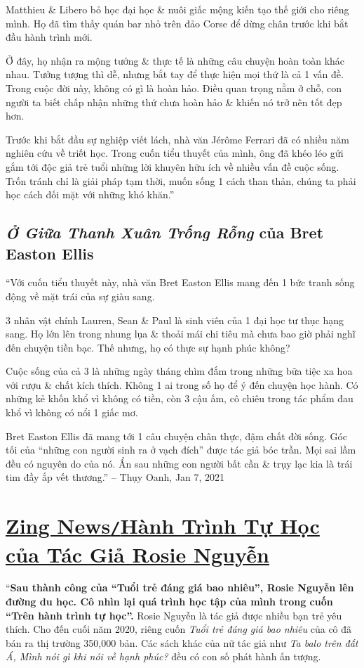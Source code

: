 \documentclass[oneside]{book}
\numberwithin{equation}{section}
\begin{document}
Matthieu \& Libero bỏ học đại học \& nuôi giấc mộng kiến tạo thế giới cho riêng mình. Họ đã tìm thấy quán bar nhỏ trên đảo Corse để dừng chân trước khi bắt đầu hành trình mới.

Ở đây, họ nhận ra mộng tưởng \& thực tế là những câu chuyện hoàn toàn khác nhau. Tưởng tượng thì dễ, nhưng bắt tay để thực hiện mọi thứ là cả 1 vấn đề. Trong cuộc đời này, không có gì là hoàn hảo. Điều quan trọng nằm ở chỗ, con người ta biết chấp nhận những thứ chưa hoàn hảo \& khiến nó trở nên tốt đẹp hơn.

Trước khi bắt đầu sự nghiệp viết lách, nhà văn J\'er\^ome Ferrari đã có nhiều năm nghiên cứu về triết học. Trong cuốn tiểu thuyết của mình, ông đã khéo léo gửi gắm tới độc giả trẻ tuổi những lời khuyên hữu ích về nhiều vấn đề cuộc sống. Trốn tránh chỉ là giải pháp tạm thời, muốn sống 1 cách than thản, chúng ta phải học cách đối mặt với những khó khăn.''

\subsection{\textit{Ở Giữa Thanh Xuân Trống Rỗng} của Bret Easton Ellis}
``Với cuốn tiểu thuyết này, nhà văn Bret Easton Ellis mang đến 1 bức tranh sống động về mặt trái của sự giàu sang.

3 nhân vật chính Lauren, Sean \& Paul là sinh viên của 1 đại học tư thục hạng sang. Họ lớn lên trong nhung lụa \& thoải mái chi tiêu mà chưa bao giờ phải nghĩ đến chuyện tiền bạc. Thế nhưng, họ có thực sự hạnh phúc không?

Cuộc sống của cả 3 là những ngày tháng chìm đắm trong những bữa tiệc xa hoa với rượu \& chất kích thích. Không 1 ai trong số họ để ý đến chuyện học hành. Có những kẻ khốn khổ vì không có tiền, còn 3 cậu ấm, cô chiêu trong tác phẩm đau khổ vì không có nổi 1 giấc mơ.

Bret Easton Ellis đã mang tới 1 câu chuyện chân thực, đậm chất đời sống. Góc tối của ``những con người sinh ra ở vạch đích'' được tác giả bóc trần. Mọi sai lầm đều có nguyên do của nó. Ẩn sau những con người bất cần \& trụy lạc kia là trái tim đầy ắp vết thương.'' -- Thụy Oanh, Jan 7, 2021


\section{\href{https://zingnews.vn/hanh-trinh-tu-hoc-cua-tac-gia-rosie-nguyen-post1251308.html}{Zing News\texttt{/}Hành Trình Tự Học của Tác Giả Rosie Nguyễn}}
``\textbf{Sau thành công của ``Tuổi trẻ đáng giá bao nhiêu'', Rosie Nguyễn lên đường du học. Cô nhìn lại quá trình học tập của mình trong cuốn ``Trên hành trình tự học''.} Rosie Nguyễn là tác giả được nhiều bạn trẻ yêu thích. Cho đến cuối năm 2020, riêng cuốn \textit{Tuổi trẻ đáng giá bao nhiêu} của cô đã bán ra thị trường 350,000 bản. Các sách khác của nữ tác giả như \textit{Ta balo trên đất Á, Mình nói gì khi nói về hạnh phúc?} đều có con số phát hành ấn tượng.
\end{document}
